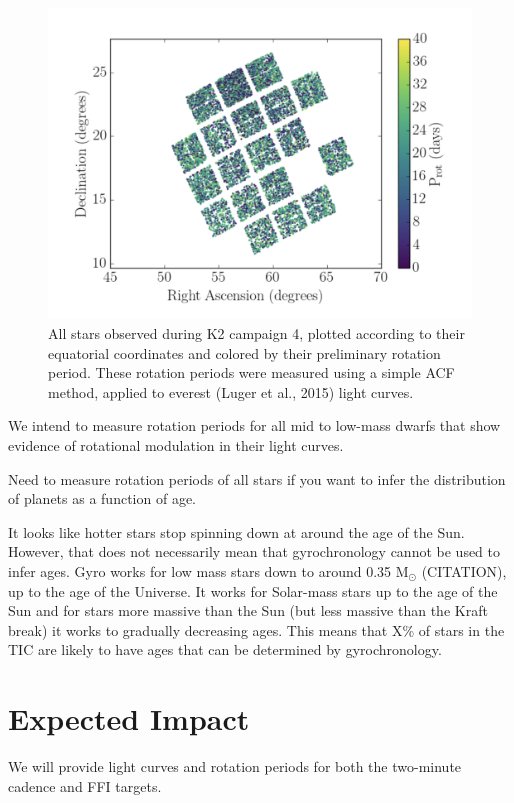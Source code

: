 \documentclass[useAMS, usenatbib, preprint, 12pt]{aastex}
\begin{document}
\begin{figure}
\begin{center}
\includegraphics[width=6in, clip=true]{Kalesalad.png}
\caption{All stars observed during K2 campaign 4, plotted according to their
equatorial coordinates and colored by their preliminary rotation period.
These rotation periods were measured using a simple ACF method, applied to
    everest (Luger et al., 2015) light curves.}
\label{fig:kalesalad}
\end{center}
\end{figure}

We intend to measure rotation periods for all mid to low-mass dwarfs that show
evidence of rotational modulation in their light curves.

Need to measure rotation periods of all stars if you want to infer the
distribution of planets as a function of age.

It looks like hotter stars stop spinning down at around the age of the Sun.
However, that does not necessarily mean that gyrochronology cannot be used to
infer ages.
Gyro works for low mass stars down to around 0.35 M$_\odot$ (CITATION), up to
the age of the Universe.
It works for Solar-mass stars up to the age of the Sun and for stars more
massive than the Sun (but less massive than the Kraft break) it works to
gradually decreasing ages.
This means that X\% of stars in the TIC are likely to have ages that can be
determined by gyrochronology.

\section{Expected Impact}
We will provide light curves and rotation periods for both the two-minute
cadence and FFI targets.
\end{document}
